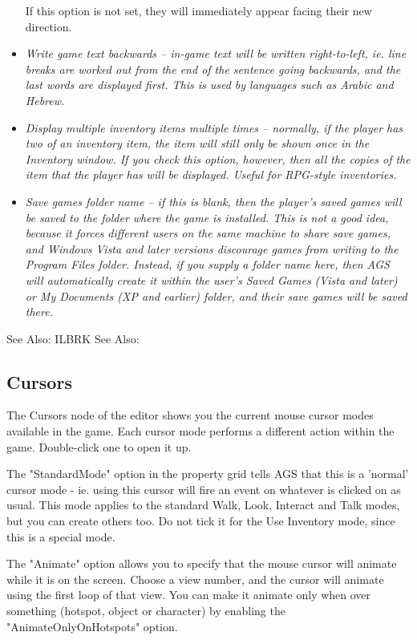 \begin{itemize}
If this option is not set, they will immediately appear facing their new direction.
\item \it{Write game text backwards} -- in-game text will be written right-to-left, ie. line
breaks are worked out from the end of the sentence going backwards, and the last words
are displayed first. This is used by languages such as Arabic and Hebrew.
\item \it{Display multiple inventory items multiple times} -- normally, if the player has
two of an inventory item, the item will still only be shown once in the Inventory window.
If you check this option, however, then all the copies of the item that the player has
will be displayed. Useful for RPG-style inventories.
\item \it{Save games folder name} -- if this is blank, then the player's saved games will
be saved to the folder where the game is installed. This is not a good idea, because it
forces different users on the same machine to share save games, and Windows Vista and later versions discourage
games from writing to the Program Files folder. Instead, if you supply a folder name here,
then AGS will automatically create it within the user's Saved Games (Vista and later) or My Documents
(XP and earlier) folder, and their save games will be saved there.
\end{itemize}

See Also:  ILBRK
See Also: 


\subsection{Cursors}%

The Cursors node of the editor shows you the current mouse cursor modes available in
the game. Each cursor mode performs a different action within the game. Double-click
one to open it up.

The "StandardMode" option in the property grid tells AGS that this is a 'normal' cursor mode - ie.
using this cursor will fire an event on whatever is clicked on as usual. This
mode applies to the standard Walk, Look, Interact and Talk modes, but you can create
others too. Do not tick it for the Use Inventory mode, since this is a special mode.

The "Animate" option allows you to specify that the mouse cursor will animate while it
is on the screen. Choose a view number, and the cursor will animate using the first
loop of that view. You can make it animate only when over something (hotspot, object
or character) by enabling the "AnimateOnlyOnHotspots" option.

